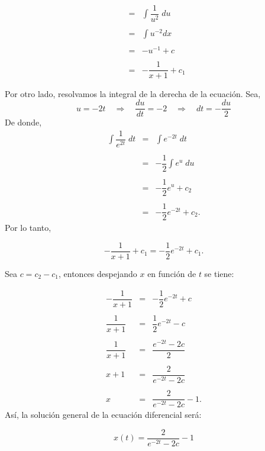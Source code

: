 \begin{enumerate}
\begin{multicols}{2}
$$\begin{array}{rcl}
						       &=& \displaystyle\int \dfrac{1}{u^2}\; du\\\\
						       &=& \displaystyle\int u^{-2}dx\\\\
						       &=& -u^{-1}+c\\\\
						       &=& -\dfrac{1}{x+1}+c_1\\\\
	\end{array}
	$$
	Por otro lado, resolvamos la integral de la derecha de la ecuación. Sea,
	$$u=-2t\quad \Rightarrow \quad \dfrac{du}{dt}=-2 \quad \Rightarrow \quad dt=-\dfrac{du}{2}$$
	De donde,
	$$
	\begin{array}{rcl}
	    \displaystyle\int \dfrac{1}{e^{2t}}\; dt &=& \displaystyle\int e^{-2t}\; dt\\\\
						     &=& -\dfrac{1}{2}\displaystyle\int e^{u}\; du\\\\
						     &=& -\dfrac{1}{2}e^{u}+c_2\\\\
						     &=& -\dfrac{1}{2}e^{-2t}+c_2.
	\end{array}
	$$
	Por lo tanto, 
	\begin{tcolorbox}
	    $$-\dfrac{1}{x+1}+c_1=-\dfrac{1}{2}e^{-2t}+c_1.$$
	\end{tcolorbox}

	Sea $c=c_2-c_1$, entonces despejando $x$ en función de $t$ se tiene:

	$$
	\begin{array}{rcl}
	    -\dfrac{1}{x+1}&=&-\dfrac{1}{2}e^{-2t}+c\\\\
	    \dfrac{1}{x+1}&=&\dfrac{1}{2}e^{-2t}-c\\\\
	    \dfrac{1}{x+1}&=&\dfrac{e^{-2t}-2c}{2}\\\\
	    x+1 &=& \dfrac{2}{e^{-2t}-2c}\\\\
	    x &=& \dfrac{2}{e^{-2t}-2c}-1.
	\end{array}
	$$
	Así, la solución general de la ecuación diferencial será:
	\begin{tcolorbox}
	    $$x(t) = \dfrac{2}{e^{-2t}-2c}-1$$
	\end{tcolorbox}


\end{multicols}
\end{enumerate}
